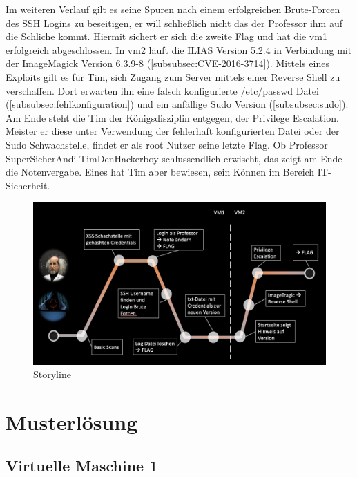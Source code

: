 \documentclass[10pt, a4paper,onecolumn ,titlepage]{article}
\begin{document}
    Im weiteren Verlauf gilt es seine Spuren nach einem erfolgreichen Brute-Forcen des SSH Logins zu beseitigen, er will schließlich nicht das der Professor ihm auf die Schliche kommt.
    Hiermit sichert er sich die zweite Flag und hat die \ac{vm}1 erfolgreich abgeschlossen.
    In \ac{vm}2 läuft die ILIAS Version 5.2.4 in Verbindung mit der ImageMagick Version 6.3.9-8 (\ref{subsubsec:CVE-2016-3714}).
    Mittels eines Exploits gilt es für Tim, sich Zugang zum Server mittels einer Reverse Shell zu verschaffen.
    Dort erwarten ihn eine falsch konfigurierte /etc/passwd Datei (\ref{subsubsec:fehlkonfiguration}) und ein anfällige Sudo Version (\ref{subsubsec:sudo}).
    Am Ende steht die Tim der Königsdisziplin entgegen, der Privilege Escalation.
    Meister er diese unter Verwendung der fehlerhaft konfigurierten Datei oder der Sudo Schwachstelle, findet er als root Nutzer seine letzte Flag.
    Ob Professor SuperSicherAndi TimDenHackerboy schlussendlich erwischt, das zeigt am Ende die Notenvergabe.
    Eines hat Tim aber bewiesen, sein Können im Bereich IT-Sicherheit.

    \begin{figure}[H]
        \centering
        \includegraphics[width=1\textwidth]{other_pictures/storyline}
        \caption{Storyline }
        \label{fig:storylineGraphic}
    \end{figure}

    \section{Musterlösung}
    \label{sec:musterloesung}

    \subsection{Virtuelle Maschine 1} %
    \label{subsec:vm1}
\end{document}
